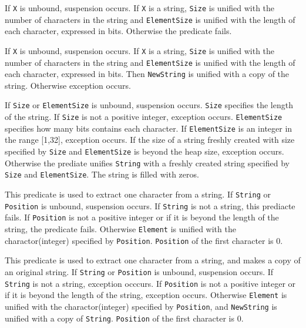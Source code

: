 \begin{itemize}

If \verb|X| is unbound, suspension occurs. If \verb|X| is a string,
\verb|Size| is unified with the number of characters in the string
and \verb|ElementSize| is unified with the length of each character,
expressed in bits. Otherwise the predicate fails.

If \verb|X| is unbound, suspension occurs. If \verb|X| is a string,
\verb|Size| is unified with the number of characters in the string
and \verb|ElementSize| is unified with the length of each character,
expressed in bits. Then \verb|NewString| is unified with a copy of the string.
Otherwise exception occurs.

If \verb|Size| or \verb|ElementSize| is unbound, suspension occurs.
\verb|Size| specifies the length of the string.
If \verb|Size| is not a positive integer, exception occurs.
\verb|ElementSize| specifies how many bits contains each character.
If \verb|ElementSize| is an integer in the range [1,32], exception occurs.
If the size of a string freshly created with size specified by
\verb|Size| and \verb|ElementSize| is beyond the heap size, exception occurs.
Otherwise the prediate unifies \verb|String| with a freshly created string
specified by \verb|Size| and \verb|ElementSize|.
The string is filled with zeros.

This predicate is used to extract one character from a string.
If \verb|String| or \verb|Position| is unbound, suspension occurs.
If \verb|String| is not a string, this prediacte fails.
If \verb|Position| is not a positive integer or if it is beyond the length of
the string, the predicate fails.
Otherwise \verb|Element| is unified with the charactor(integer) specified by
\verb|Position|. \verb|Position| of the first character is 0.

This predicate is used to extract one character from a string, and
makes a copy of an original string.
If \verb|String| or \verb|Position| is unbound, suspension occurs.
If \verb|String| is not a string, exception occcurs.
If \verb|Position| is not a positive integer or if it is beyond the length of
the string, exception occurs.
Otherwise \verb|Element| is unified with the charactor(integer) specified by
\verb|Position|, and \verb|NewString| is unified with a copy of \verb|String|.
\verb|Position| of the first character is 0.


\end{itemize}
